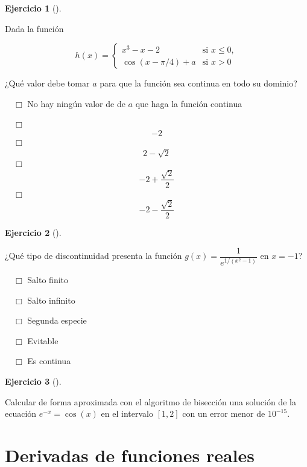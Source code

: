 \documentclass[
  a4paper,
]{scrreport}
\theoremstyle{definition}
\newtheorem{exercise}{Ejercicio}[chapter]
\theoremstyle{remark}
\begin{document}
\begin{exercise}[]\protect\hypertarget{exr-continuidad-2}{}\label{exr-continuidad-2}

Dada la función

\[
h(x)=
\begin{cases}
x^3-x-2 & \mbox{si } x\leq 0,\\
\cos(x-\pi/4)+a & \mbox{si } x>0
\end{cases}
\]

¿Qué valor debe tomar \(a\) para que la función sea continua en todo su
dominio?

${\quad\Box}$ No hay ningún valor de de $a$ que haga la función continua

${\quad\Box}$ $$-2$$
${\quad\Box}$ $$2-\sqrt{2}$$
${\quad\Box}$ $$-2+\frac{\sqrt{2}}{2}$$
${\quad\Box}$ $$-2 - \frac{\sqrt{2}}{2}$$

\end{exercise}

\begin{exercise}[]\protect\hypertarget{exr-clasificacion-discontinuidad}{}\label{exr-clasificacion-discontinuidad}

¿Qué tipo de discontinuidad presenta la función
\(g(x)=\dfrac{1}{e^{1/(x^2-1)}}\) en \(x=-1\)?

${\quad\Box}$ Salto finito

${\quad\Box}$ Salto infinito

${\quad\Box}$ Segunda especie

${\quad\Box}$ Evitable

${\quad\Box}$ Es continua

\end{exercise}

\begin{exercise}[]\protect\hypertarget{exr-raices}{}\label{exr-raices}

Calcular de forma aproximada con el algoritmo de bisección una solución
de la ecuación \(e^{-x}=\cos(x)\) en el intervalo \([1,2]\) con un error
menor de \(10^{-15}\).

\vspace{18pt}

\end{exercise}


\chapter{Derivadas de funciones
reales}\label{derivadas-de-funciones-reales}
\end{document}
